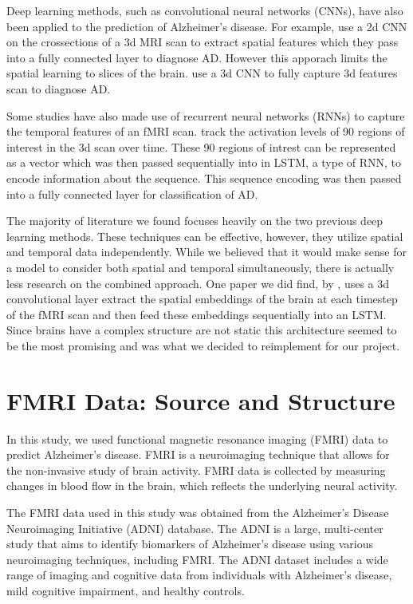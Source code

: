 \documentclass[10pt]{article}
\begin{document}
	Deep learning methods, such as convolutional neural networks (CNNs), have also been applied to the prediction of Alzheimer's disease. For example, \cite{2d-CNN} use a 2d CNN on the crossections of a 3d MRI scan to extract spatial features which they pass into a fully connected layer to diagnose AD. However this apporach limits the spatial learning to slices of the brain. \cite{3d-CNN} use a 3d CNN to fully capture 3d features scan to diagnose AD.  
	
	Some studies have also made use of recurrent neural networks (RNNs) to capture the temporal features of an fMRI scan. \cite{LSTM} track the activation levels of 90 regions of interest in the 3d scan over time. These 90 regions of intrest can be represented as a vector which was then passed sequentially into in LSTM, a type of RNN, to encode information about the sequence. This sequence encoding was then passed into a fully connected layer for classification of AD.  

	The majority of literature we found focuses heavily on the two previous deep learning methods. These techniques can be effective, however, they utilize spatial and temporal data independently. While we believed that it would make sense for a model to consider both spatial and temporal simultaneously, there is actually less research on the combined approach. One paper we did find, by \cite{Conv-LSTM}, uses a 3d convolutional layer extract the spatial embeddings of the brain at each timestep of the fMRI scan and then feed these embeddings sequentially into an LSTM. Since brains have a complex structure are not static this architecture seemed to be the most promising and was what we decided to reimplement for our project.
	
	\section{FMRI Data: Source and Structure}
	\label{sec:data}

	In this study, we used functional magnetic resonance imaging (FMRI) data to predict Alzheimer's disease. FMRI is a neuroimaging technique that allows for the non-invasive study of brain activity. FMRI data is collected by measuring changes in blood flow in the brain, which reflects the underlying neural activity.

	The FMRI data used in this study was obtained from the Alzheimer's Disease Neuroimaging Initiative (ADNI) database. The ADNI is a large, multi-center study that aims to identify biomarkers of Alzheimer's disease using various neuroimaging techniques, including FMRI. The ADNI dataset includes a wide range of imaging and cognitive data from individuals with Alzheimer's disease, mild cognitive impairment, and healthy controls.
\end{document}

